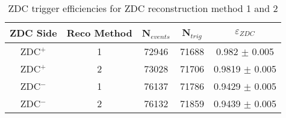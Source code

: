         \begin{table}
          \centering
          \begin{tabular}{|c|c|c|c|c|}
             ZDC Side & Reco Method & N$_{events}$ & N$_{trig}$ & $\varepsilon_{ZDC}$ \\ \hline
             ZDC$^{+}$ & 1 & 72946  & 71688 & 0.982 $\pm$ 0.005 \\ \hline
             ZDC$^{+}$ & 2 & 73028  & 71706  & 0.9819  $\pm$ 0.005  \\ \hline
             ZDC$^{-}$ & 1 & 76137  & 71786  & 0.9429  $\pm$ 0.005  \\ \hline
             ZDC$^{-}$ & 2 & 76132  & 71859  & 0.9439  $\pm$ 0.005  \\ \hline
          \end{tabular}
          \caption{ZDC trigger efficiencies for ZDC reconstruction method 1 and 
            2}
          \label{tab:zdcEfficiency}
        \end{table}

        

